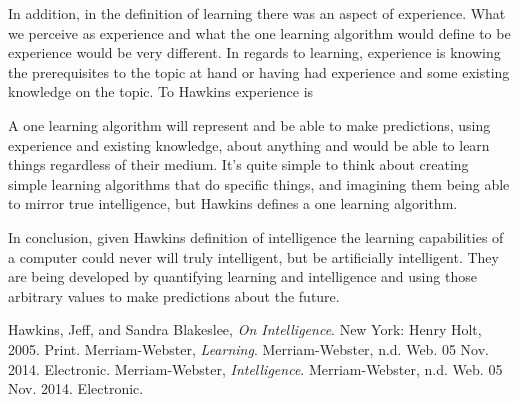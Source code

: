\documentclass[11pt, oneside]{article}
\begin{document}

\par In addition, in the definition of learning there was an aspect of experience. What we perceive as experience and what the one learning algorithm would define to be experience would be very different. In regards to learning, experience is knowing the prerequisites to the topic at hand or having had experience and some existing knowledge on the topic. To Hawkins experience is 

\par A one learning algorithm will represent and be able to make predictions, using experience and existing knowledge, about anything and would be able to learn things regardless of their medium. It's quite simple to think about creating simple learning algorithms that do specific things, and imagining them being able to mirror true intelligence, but Hawkins defines a one learning algorithm.

\par In conclusion, given Hawkins definition of intelligence the learning capabilities of a computer could never will truly intelligent, but be artificially intelligent. They are being developed by quantifying learning and intelligence and using those arbitrary values to make predictions about the future. 

\begin{thebibliography}{9}
  Hawkins, Jeff, and Sandra Blakeslee,
  \emph{On Intelligence}.
  New York: Henry Holt, 2005.
  Print.
  Merriam-Webster,
  \emph{Learning}.
  Merriam-Webster, n.d. Web. 05 Nov. 2014.
  Electronic.
  Merriam-Webster,
  \emph{Intelligence}.
  Merriam-Webster, n.d. Web. 05 Nov. 2014.
  Electronic.
\end{thebibliography}
\end{document}

